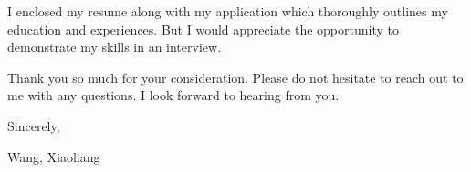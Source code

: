 \documentclass[12pt,letterpaper]{article}
\begin{document}
I enclosed my resume along with my application which thoroughly outlines my education and experiences. 
But I would appreciate the opportunity to demonstrate my skills in an interview.

Thank you so much for your consideration. Please do not hesitate to reach out to me with any questions.
I look forward to hearing from you.

\vspace{5mm}
\noindent
Sincerely,

\noindent
Wang, Xiaoliang
\end{document}
